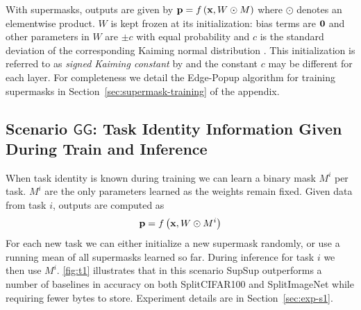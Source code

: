 \documentclass{article}
\newcommand{\ac}{SupSup\xspace}
\newcommand{\casename}[1]{\ensuremath{\mathsf{#1}}\xspace}
\newcommand{\secref}[1]{Section~\ref{sec:#1}}
\begin{document}
With supermasks, outputs are given by $\mathbf{p} = f\left( \mathbf{x}, W \odot M \right)$ where $\odot$ denotes an elementwise product. $W$ is kept frozen at its initialization: bias terms are $\mathbf{0}$ and other parameters in $W$  are $\pm c$ with equal probability and $c$ is the standard deviation of the corresponding Kaiming normal distribution \cite{he2015delving}. This initialization is referred to as \textit{signed Kaiming constant} by \cite{ramanujan2019s} and the constant $c$ may be different for each layer. For completeness we detail the Edge-Popup algorithm for training supermasks \cite{ramanujan2019s} in Section~\ref{sec:supermask-training} of the appendix.

\subsection{Scenario \casename{GG}: Task Identity Information Given During Train and Inference} \label{sec:S1}
When task identity is known during training we can learn a binary mask $M^i$ per task. $M^i$ are the only parameters learned as the weights remain fixed. Given data from task $i$, outputs are computed as
\begin{equation} \label{eq:known-task-id}
    \mathbf{p} = f\left( \mathbf{x}, W \odot M^i \right)
\end{equation}
For each new task we can either initialize a new supermask randomly, or use a running mean of all supermasks learned so far.
During inference for task $i$ we then use $M^i$. \autoref{fig:t1} illustrates that in this scenario \ac outperforms a number of baselines in accuracy 
on both SplitCIFAR100 and SplitImageNet 
while requiring fewer bytes to store. Experiment details are in \secref{exp-s1}.
\end{document}
